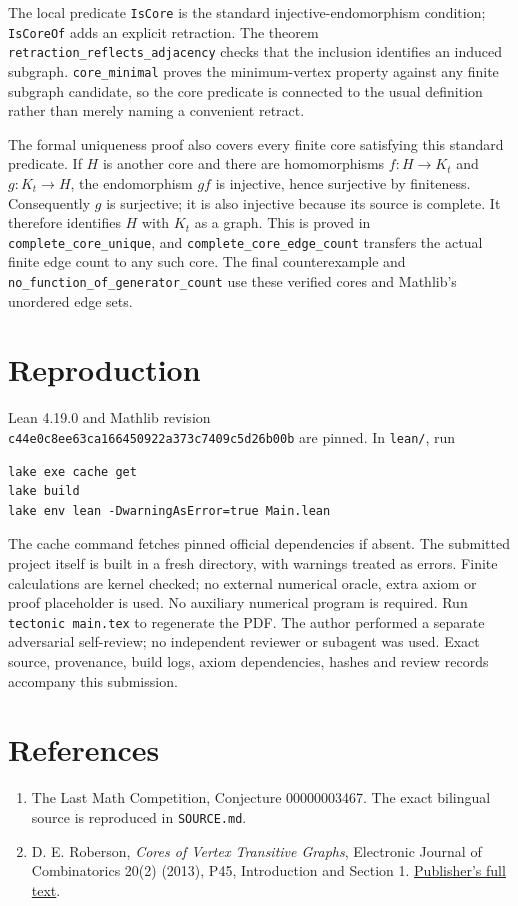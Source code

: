\documentclass[11pt]{article}
\begin{document}
The local predicate \texttt{IsCore} is the standard injective-endomorphism
condition; \texttt{IsCoreOf} adds an explicit retraction.
The theorem \texttt{retraction\_reflects\_adjacency} checks that the
inclusion identifies an induced subgraph.
\texttt{core\_minimal} proves the minimum-vertex property against any
finite subgraph candidate, so the core predicate is connected to the
usual definition rather than merely naming a convenient retract.

The formal uniqueness proof also covers every finite core satisfying
this standard predicate. If $H$ is another core and there are
homomorphisms $f:H\to K_t$ and $g:K_t\to H$, the endomorphism $gf$
is injective, hence surjective by finiteness. Consequently $g$ is
surjective; it is also injective because its source is complete.
It therefore identifies $H$ with $K_t$ as a graph. This is proved in
\texttt{complete\_core\_unique}, and
\texttt{complete\_core\_edge\_count} transfers the actual finite edge
count to any such core. The final counterexample and
\texttt{no\_function\_of\_generator\_count} use these verified cores
and Mathlib's unordered edge sets.

\section*{Reproduction}
Lean 4.19.0 and Mathlib revision\\
\texttt{c44e0c8ee63ca166450922a373c7409c5d26b00b}
are pinned. In \texttt{lean/}, run
\begin{verbatim}
lake exe cache get
lake build
lake env lean -DwarningAsError=true Main.lean
\end{verbatim}
The cache command fetches pinned official dependencies if absent.
The submitted project itself is built in a fresh directory, with
warnings treated as errors. Finite calculations are kernel checked;
no external numerical oracle, extra axiom or proof placeholder is used.
No auxiliary numerical program is required. Run
\texttt{tectonic main.tex} to regenerate the PDF.
The author performed a separate adversarial self-review; no independent
reviewer or subagent was used. Exact source, provenance, build logs,
axiom dependencies, hashes and review records accompany this submission.

\section*{References}
\begin{enumerate}
\item The Last Math Competition, Conjecture 00000003467.
The exact bilingual source is reproduced in \texttt{SOURCE.md}.
\item D. E. Roberson, \emph{Cores of Vertex Transitive Graphs},
Electronic Journal of Combinatorics 20(2) (2013), P45,
Introduction and Section 1.
\href{https://www.combinatorics.org/ojs/index.php/eljc/article/download/v20i2p45/pdf/}{Publisher's full text}.
\end{enumerate}
\end{document}
